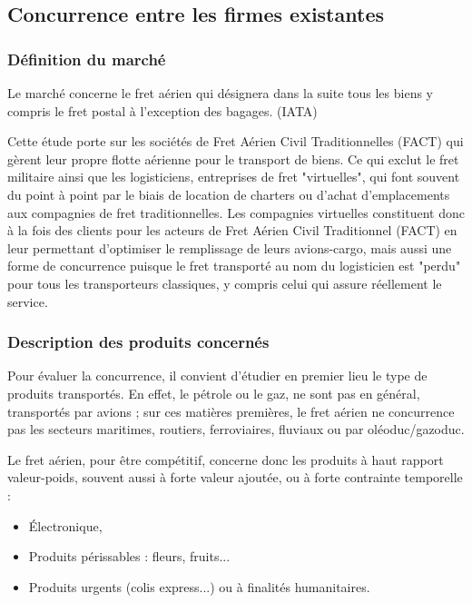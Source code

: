 
\subsection{Concurrence entre les firmes existantes}

\subsubsection{Définition du marché}

Le marché concerne le fret aérien qui désignera dans la suite tous les biens y compris le fret postal à l’exception des bagages. (IATA)

Cette étude porte sur les sociétés de Fret Aérien Civil Traditionnelles (FACT) qui gèrent leur propre flotte aérienne pour le transport de biens. Ce qui exclut le fret militaire ainsi que les logisticiens, entreprises de fret "virtuelles", qui font souvent du point à point par le biais de location de charters ou d'achat d'emplacements aux compagnies de fret traditionnelles. Les compagnies virtuelles constituent donc à la fois des clients pour les acteurs de Fret Aérien Civil Traditionnel (FACT) en leur permettant d'optimiser le remplissage de leurs avions-cargo, mais aussi une forme de concurrence puisque le fret transporté au nom du logisticien est "perdu" pour tous les transporteurs classiques, y compris celui qui assure réellement le service.



\subsubsection{Description des produits concernés}
\label{produits}
Pour évaluer la concurrence, il convient d'étudier en premier lieu le type de produits transportés. En effet, le pétrole ou le gaz, ne sont pas en général, transportés par avions ; sur ces matières premières, le fret aérien ne concurrence pas les secteurs maritimes, routiers, ferroviaires, fluviaux ou par oléoduc/gazoduc. 

Le fret aérien, pour être compétitif, concerne donc les produits à haut rapport valeur-poids, souvent aussi à forte valeur ajoutée, ou à forte contrainte temporelle :


\begin{itemize}
	\item Électronique,
	\item Produits périssables : fleurs, fruits...
	\item Produits urgents (colis express...) ou à finalités humanitaires.
\end{itemize}



